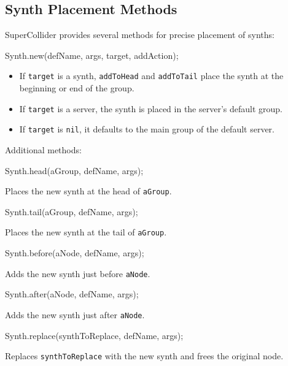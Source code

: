 \subsection{Synth Placement Methods}

SuperCollider provides several methods for precise placement of synths:

\begin{supercollider*}
Synth.new(defName, args, target, addAction);
\end{supercollider*}

\begin{itemize}
    \item If \texttt{target} is a synth, \texttt{addToHead} and \texttt{addToTail} place the synth at the beginning or end of the group.
    \item If \texttt{target} is a server, the synth is placed in the server's default group.
    \item If \texttt{target} is \texttt{nil}, it defaults to the main group of the default server.
\end{itemize}

Additional methods:

\begin{supercollider*}
Synth.head(aGroup, defName, args);
\end{supercollider*}

Places the new synth at the head of \texttt{aGroup}.

\begin{supercollider*}
Synth.tail(aGroup, defName, args);
\end{supercollider*}

Places the new synth at the tail of \texttt{aGroup}.

\begin{supercollider*}
Synth.before(aNode, defName, args);
\end{supercollider*}

Adds the new synth just before \texttt{aNode}.

\begin{supercollider*}
Synth.after(aNode, defName, args);
\end{supercollider*}

Adds the new synth just after \texttt{aNode}.

\begin{supercollider*}
Synth.replace(synthToReplace, defName, args);
\end{supercollider*}

Replaces \texttt{synthToReplace} with the new synth and frees the original node.

